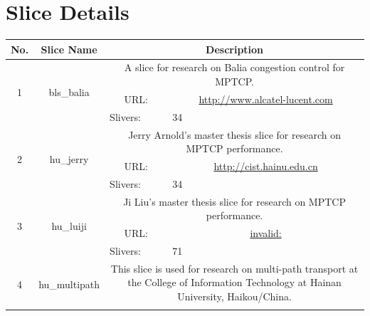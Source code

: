 



\chapter{Slice Details}
\label{cha:Slice-Details}


\begin{small}
\begin{center}
\begin{longtable}{|c|c|c|c|}
 \hline
 No. & Slice Name & \multicolumn{2}{|p{20em}|}{Description} \\ \hline
 \multirow{3}{*}{1} & \multirow{3}{*}{\index{bls\_balia}\index{Slice!bls\_balia}bls\_balia} & \multicolumn{2}{|p{30em}|}{A slice for research on Balia congestion control for MPTCP.} \\* \cline{3-3}\cline{4-4}
  &  & \multicolumn{1}{|p{5em}|}{URL:} & \multicolumn{1}{|p{22.5em}|}{\url{http://www.alcatel-lucent.com}} \\* \cline{3-3}\cline{4-4}
  &  & \multicolumn{1}{|l|}{Slivers:} & \multicolumn{1}{|l|}{34} \\ \hline
 \multirow{3}{*}{2} & \multirow{3}{*}{\index{hu\_jerry}\index{Slice!hu\_jerry}hu\_jerry} & \multicolumn{2}{|p{30em}|}{Jerry Arnold's master thesis slice for research on MPTCP performance.} \\* \cline{3-3}\cline{4-4}
  &  & \multicolumn{1}{|p{5em}|}{URL:} & \multicolumn{1}{|p{22.5em}|}{\url{http://cist.hainu.edu.cn}} \\* \cline{3-3}\cline{4-4}
  &  & \multicolumn{1}{|l|}{Slivers:} & \multicolumn{1}{|l|}{34} \\ \hline
 \multirow{3}{*}{3} & \multirow{3}{*}{\index{hu\_luiji}\index{Slice!hu\_luiji}hu\_luiji} & \multicolumn{2}{|p{30em}|}{Ji Liu's master thesis slice for research on MPTCP performance.} \\* \cline{3-3}\cline{4-4}
  &  & \multicolumn{1}{|p{5em}|}{URL:} & \multicolumn{1}{|p{22.5em}|}{\url{invalid:}} \\* \cline{3-3}\cline{4-4}
  &  & \multicolumn{1}{|l|}{Slivers:} & \multicolumn{1}{|l|}{71} \\ \hline
 \multirow{3}{*}{4} & \multirow{3}{*}{\index{hu\_multipath}\index{Slice!hu\_multipath}hu\_multipath} & \multicolumn{2}{|p{30em}|}{This slice is used for research on multi-path transport at the College of Information Technology at Hainan University, Haikou/China.} \\* \cline{3-3}\cline{4-4}

\end{longtable}
\end{center}
\end{small}
